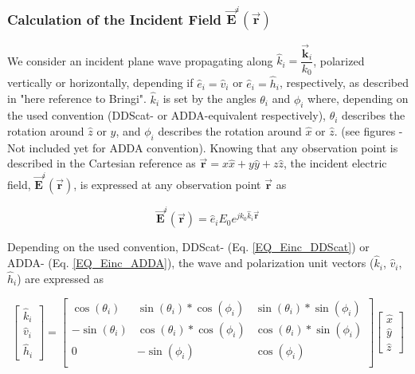 \documentclass{article}
\begin{document}
\subsubsection{Calculation of the Incident Field $\vec{\textbf{E}}^i(\vec{\textbf{r}})$} 
We consider an incident plane wave propagating along $\hat{k}_i = \dfrac{\vec{\textbf{k}}_i}{k_0}$, polarized vertically or horizontally, depending if $\hat{e}_i=\hat{v}_i$ or $\hat{e}_i=\hat{h}_i$, respectively, as described in "here reference to Bringi". $\hat{k}_i$ is set by the angles $\theta_i$ and $\phi_i$ where, depending on the used convention (DDScat- or ADDA-equivalent respectively), $\theta_i$ describes the rotation around $\hat{z}$ or $\hat{y}$, and $\phi_i$ describes the rotation around $\hat{x}$ or $\hat{z}$. (see figures - Not included yet for ADDA convention). Knowing that any observation point is described in the Cartesian reference as $\vec{\textbf{r}}=x\hat{x}+y\hat{y}+z\hat{z}$, the incident electric field, $\vec{\textbf{E}}^i(\vec{\textbf{r}})$, is expressed at any observation point $\vec{\textbf{r}}$ as

\begin{equation}
\label{EQ_Einc}
\vec{\textbf{E}}^i(\vec{\textbf{r}}) = \hat{e}_i E_0 e^{jk_0\hat{k}_i\vec{\textbf{r}}}
\end{equation} 

Depending on the used convention, DDScat- (Eq. \ref{EQ_Einc_DDScat}) or ADDA- (Eq. \ref{EQ_Einc_ADDA}), the wave and polarization unit vectors ($\hat{k}_i$, $\hat{v}_i$, $\hat{h}_i$) are expressed as 

\begin{equation}
\label{EQ_Einc_DDScat}
\begin{bmatrix}
\hat{k}_i \\
\hat{v}_i \\
\hat{h}_i 
\end{bmatrix} = 
\begin{bmatrix}
\cos(\theta_i) & \sin(\theta_i)*\cos(\phi_i) & \sin(\theta_i)*\sin(\phi_i)\\
- \sin(\theta_i) & \cos(\theta_i)*\cos(\phi_i) & \cos(\theta_i)*\sin(\phi_i)\\
0 & - \sin(\phi_i) & \cos(\phi_i)\\
\end{bmatrix}
\begin{bmatrix}
\hat{x} \\
\hat{y} \\
\hat{z} 
\end{bmatrix}
\end{equation}     
\end{document}
